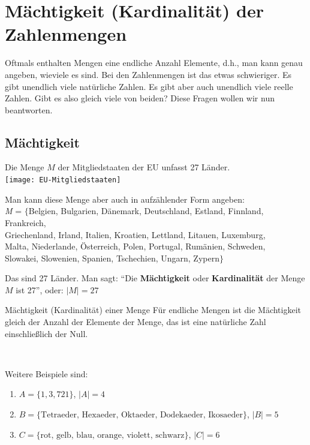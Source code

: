 \section{Mächtigkeit (Kardinalität) der Zahlenmengen}
Oftmals enthalten Mengen eine endliche Anzahl Elemente, d.h., man kann genau angeben, wieviele es sind. Bei den Zahlenmengen ist das etwas schwieriger. Es gibt unendlich viele natürliche Zahlen. Es gibt aber auch unendlich viele reelle Zahlen. Gibt es also gleich viele von beiden? Diese Fragen wollen wir nun beantworten.

\subsection{Mächtigkeit}
Die Menge $M$ der Mitgliedstaaten der EU unfasst 27 Länder.\\
\texttt{[image: EU-Mitgliedstaaten]}

Man kann diese Menge aber auch in aufzählender Form angeben:\\
\emph{M} = $\{$Belgien, Bulgarien, Dänemark, Deutschland, Estland, Finnland, Frankreich,\\ Griechenland, Irland, Italien, Kroatien, Lettland, Litauen, Luxemburg,\\ Malta, Niederlande, Österreich, Polen, Portugal, Rumänien, Schweden,\\ Slowakei, Slowenien, Spanien, Tschechien, Ungarn, Zypern$\}$

Das sind 27 Länder. Man sagt: "`Die \textbf{Mächtigkeit} oder \textbf{Kardinalität} der Menge $M$ ist 27"', oder: $|M|=27$

\begin{defn}{Mächtigkeit (Kardinalität) einer Menge}
	Für endliche Mengen ist die Mächtigkeit gleich der Anzahl der Elemente der Menge, das ist eine natürliche Zahl einschließlich der Null. 
\end{defn}~
\vspace{5mm}


\begin{example}
	Weitere Beispiele sind:
	\begin{enumerate}
		\item
			$A=\{1, 3, 7 21\}$, \quad $|A|=4$
		\item
			$B=\{\textrm{Tetraeder, Hexaeder, Oktaeder, Dodekaeder, Ikosaeder}\}$, \quad $|B|=5$
		\item
			$C=\{\textrm{rot, gelb, blau, orange, violett, schwarz}\}$, \quad $|C|=6$
	\end{enumerate}
\end{example}

